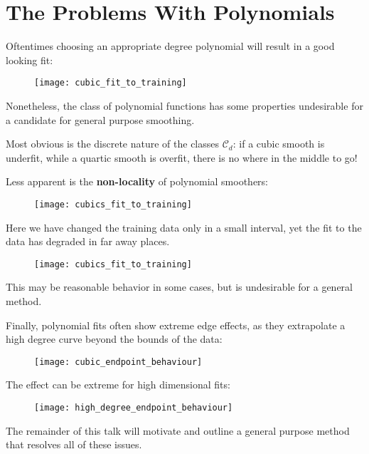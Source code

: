 \documentclass{beamer}
\begin{document}
\section{The Problems With Polynomials}
%
\begin{frame}
  Oftentimes choosing an appropriate degree polynomial will result in a  good looking fit:
  \begin{figure}
    \texttt{[image: cubic\_fit\_to\_training]}
  \end{figure}
  Nonetheless, the class of polynomial functions has some properties undesirable for a candidate for general purpose smoothing.
\end{frame}
%
\begin{frame}
  Most obvious is the discrete nature of the classes $\mathcal{C}_d$: if a cubic smooth is underfit, while a quartic smooth is overfit, there is no where in the middle to go!
\end{frame}
%
\begin{frame}
  Less apparent is the \textbf{non-locality} of polynomial smoothers:
  \begin{figure}
    \texttt{[image: cubics\_fit\_to\_training]}
  \end{figure}
\end{frame}
%
\begin{frame}
  Here we have changed the training data only in a small interval, yet the fit to the data has degraded in far away places.
  \begin{figure}
    \texttt{[image: cubics\_fit\_to\_training]}
  \end{figure}
  This may be reasonable behavior in some cases, but is undesirable for a general method.
\end{frame}
%
\begin{frame}
  Finally, polynomial fits often show extreme edge effects, as they extrapolate a high degree curve beyond the bounds of the data:
   \begin{figure}
    \texttt{[image: cubic\_endpoint\_behaviour]}
  \end{figure}
\end{frame}
%
\begin{frame}
  The effect can be extreme for high dimensional fits:
  \begin{figure}
    \texttt{[image: high\_degree\_endpoint\_behaviour]}
  \end{figure}
\end{frame}
%
\begin{frame}
  The remainder of this talk will motivate and outline a general purpose method that resolves all of these issues.
\end{frame}	
\end{document}
